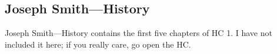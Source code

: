 \subsection{Joseph Smith---History}
	\label{JSHISTORY}
	
	Joseph Smith---History contains the first five chapters of HC 1. I have not included it here; if you really care, go open the HC.